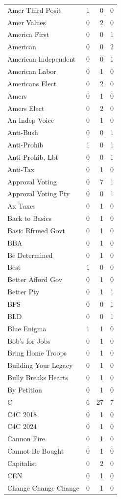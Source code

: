 \begin{supertabular}{lrrr}
Amer Third Posit & 1 & 0 & 0\\
Amer Values & 0 & 2 & 0\\
America First & 0 & 0 & 1\\
American & 0 & 0 & 2\\
American Independent & 0 & 0 & 1\\
American Labor & 0 & 1 & 0\\
Americans Elect & 0 & 2 & 0\\
Amers & 0 & 1 & 0\\
Amers Elect & 0 & 2 & 0\\
An Indep Voice & 0 & 1 & 0\\
Anti-Bush & 0 & 0 & 1\\
Anti-Prohib & 1 & 0 & 1\\
Anti-Prohib, Lbt & 0 & 0 & 1\\
Anti-Tax & 0 & 1 & 0\\
Approval Voting & 0 & 7 & 1\\
Approval Voting Pty & 0 & 0 & 1\\
Ax Taxes & 0 & 1 & 0\\
Back to Basics & 0 & 1 & 0\\
Basic Rfrmed Govt & 0 & 1 & 0\\
BBA & 0 & 1 & 0\\
Be Determined & 0 & 1 & 0\\
Best & 1 & 0 & 0\\
Better Afford Gov & 0 & 1 & 0\\
Better Pty & 0 & 1 & 1\\
BFS & 0 & 0 & 1\\
BLD & 0 & 0 & 1\\
Blue Enigma & 1 & 1 & 0\\
Bob's for Jobs & 0 & 1 & 0\\
Bring Home Troops & 0 & 1 & 0\\
Building Your Legacy & 0 & 1 & 0\\
Bully Breaks Hearts & 0 & 1 & 0\\
By Petition & 0 & 1 & 0\\
C & 6 & 27 & 7\\
C4C 2018 & 0 & 1 & 0\\
C4C 2024 & 0 & 1 & 0\\
Cannon Fire & 0 & 1 & 0\\
Cannot Be Bought & 0 & 1 & 0\\
Capitalist & 0 & 2 & 0\\
CEN & 0 & 1 & 0\\
Change Change Change & 0 & 1 & 0\\

\end{supertabular}
